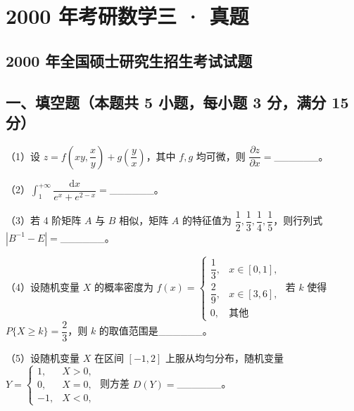 \documentclass[UTF8,12pt]{ctexart}
\begin{document}
\section*{2000 年考研数学三 · 真题}
\subsection*{2000 年全国硕士研究生招生考试试题}

\subsection*{一、填空题（本题共 5 小题，每小题 3 分，满分 15 分）}

（1）设 \(\displaystyle z=f\left(xy,\allowbreak \dfrac{\displaystyle x}{\displaystyle y}\right)+g\left(\dfrac{\displaystyle y}{\displaystyle x}\right)\)，其中 \(\displaystyle f,\allowbreak g\) 均可微，则 \(\displaystyle \dfrac{\displaystyle \partial z}{\displaystyle \partial x}=\)\_\_\_\_\_\_。


（2）\(\displaystyle \int_1^{+\infty}\dfrac{\displaystyle \mathrm dx}{\displaystyle e^x+e^{2-x}}=\)\_\_\_\_\_\_。


（3）若 4 阶矩阵 \(\displaystyle A\) 与 \(\displaystyle B\) 相似，矩阵 \(\displaystyle A\) 的特征值为 \(\displaystyle \dfrac{\displaystyle 1}{\displaystyle 2},\allowbreak \dfrac{\displaystyle 1}{\displaystyle 3},\allowbreak \dfrac{\displaystyle 1}{\displaystyle 4},\allowbreak \dfrac{\displaystyle 1}{\displaystyle 5}\)，则行列式 \(\displaystyle |B^{-1}-E|=\)\_\_\_\_\_\_。


（4）设随机变量 \(\displaystyle X\) 的概率密度为 \(\displaystyle f(x)=\begin{cases}\dfrac{\displaystyle 1}{\displaystyle 3},\allowbreak &x\in[0,\allowbreak 1],\allowbreak \\\dfrac{\displaystyle 2}{\displaystyle 9},\allowbreak &x\in[3,\allowbreak 6],\allowbreak \\0,\allowbreak &\text{其他}\end{cases}\) 若 \(\displaystyle k\) 使得 \(\displaystyle P\{X\ge k\}=\dfrac{\displaystyle 2}{\displaystyle 3}\)，则 \(\displaystyle k\) 的取值范围是\_\_\_\_\_\_。


（5）设随机变量 \(\displaystyle X\) 在区间 \(\displaystyle [-1,\allowbreak 2]\) 上服从均匀分布，随机变量 \(\displaystyle Y=\begin{cases}1,\allowbreak &X>0,\allowbreak \\0,\allowbreak &X=0,\allowbreak \\-1,\allowbreak &X<0,\allowbreak \end{cases}\) 则方差 \(\displaystyle D(Y)=\)\_\_\_\_\_\_。
\end{document}
